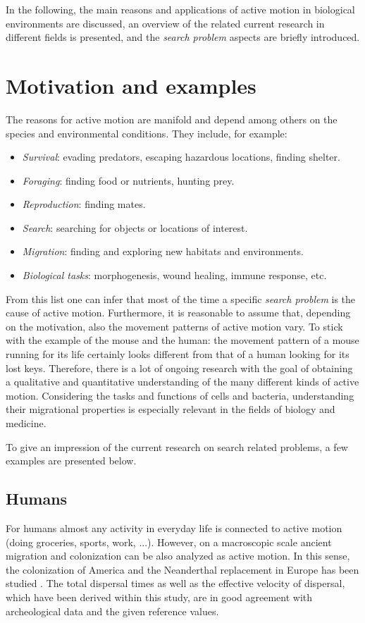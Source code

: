 In the following, the main reasons and applications of active motion in biological environments are discussed, an overview of the related current research in different fields is presented, and the \textit{search problem} aspects are briefly introduced.

\section{Motivation and examples}\label{sec:MotAndExa}
The reasons for active motion are manifold and depend among others on the species and environmental conditions.  They include, for example:

\begin{itemize}
 \item \emph{Survival}: evading predators, escaping hazardous locations, finding shelter.
 \item \emph{Foraging}: finding food or nutrients, hunting prey.
 \item \emph{Reproduction}: finding mates.
 \item \emph{Search}: searching for objects or locations of interest.
 \item \emph{Migration}: finding and exploring new habitats and environments.
 \item \emph{Biological tasks}: \eg morphogenesis, wound healing, immune response, etc.
\end{itemize}

From this list one can infer that most of the time a specific \emph{search problem} is the cause of active motion.
Furthermore, it is reasonable to assume that, depending on the motivation, also the movement patterns of active motion vary. To stick with the example of the mouse and the human: the movement pattern of a mouse running for its life certainly looks different from that of a human looking for its lost keys. Therefore, there is a lot of ongoing research with the goal of obtaining a qualitative and quantitative understanding of the many different kinds of active motion. Considering the tasks and functions of cells and bacteria, understanding their migrational properties is especially relevant in the fields of biology and medicine.

To give an impression of the current research on search related problems, a few examples are presented below.

\subsection*{Humans}
For humans almost any activity in everyday life is connected to active motion (\eg doing groceries, sports, work, ...). However, on a macroscopic scale ancient migration and colonization can be also analyzed as active motion. In this sense, the colonization of America and the Neanderthal replacement in Europe has been studied \cite{flores:2007}. The total dispersal times as well as the effective velocity of dispersal, which have been derived within this study, are in good agreement with archeological data and the given reference values.

